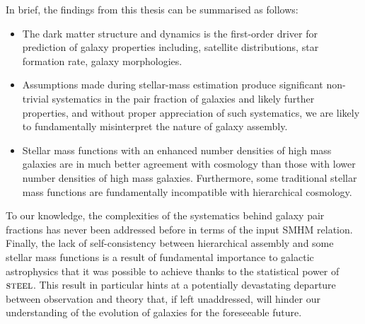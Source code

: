 In brief, the findings from this thesis can be summarised as follows: 
\begin{itemize}
    \item The dark matter structure and dynamics is the first-order driver for prediction of galaxy properties including, satellite distributions, star formation rate, galaxy morphologies. 
    \item Assumptions made during stellar-mass estimation produce significant non-trivial systematics in the pair fraction of galaxies and likely further properties, and without proper appreciation of such systematics, we are likely to fundamentally misinterpret the nature of galaxy assembly. 
    \item Stellar mass functions with an enhanced number densities of high mass galaxies are in much better agreement with \LCDM cosmology than those with lower number densities of high mass galaxies. Furthermore, some traditional stellar mass functions are fundamentally incompatible with \LCDM hierarchical cosmology.
\end{itemize}

To our knowledge, the complexities of the systematics behind galaxy pair fractions has never been addressed before in terms of the input SMHM relation. Finally, the lack of self-consistency between hierarchical \LCDM assembly and some stellar mass functions is a result of fundamental importance to galactic astrophysics that it was possible to achieve thanks to the statistical power of $\textsc{steel}$. This result in particular hints at a potentially devastating departure between observation and theory that, if left unaddressed, will hinder our understanding of the evolution of galaxies for the foreseeable future.
